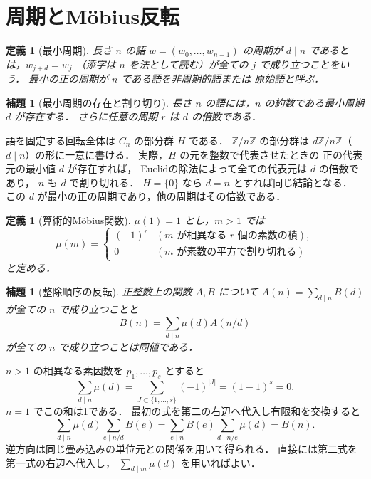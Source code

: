 \documentclass[a5paper,10pt,onecolumn]{jsarticle}
\makeatletter
\theoremstyle{mathnotetheorem}
\newtheorem{definition}[theorem]{定義}
\newtheorem{lemma}[theorem]{補題}
\renewcommand{\proofname}{証明}
\renewenvironment{proof}[1][\proofname]{%
  \par\pushQED{\qed}\normalfont\topsep4\p@\@plus2\p@\relax
  \trivlist\item[\hskip\labelsep\bfseries #1]\ignorespaces
}{\popQED\endtrivlist\@endpefalse}
\makeatother
\begin{document}
\section{周期とM\"obius反転}
\begin{definition}[最小周期]
長さ $n$ の語 $w=(w_0,\ldots,w_{n-1})$ の周期が
$d\mid n$ であるとは，$w_{j+d}=w_j$
（添字は $n$ を法として読む）が全ての $j$ で成り立つことをいう．
最小の正の周期が $n$ である語を\emph{非周期的語}または
\emph{原始語}と呼ぶ．
\end{definition}

\begin{lemma}[最小周期の存在と割り切り]\label{lem:minperiod}
長さ $n$ の語には，$n$ の約数である最小周期 $d$ が存在する．
さらに任意の周期 $r$ は $d$ の倍数である．
\end{lemma}
\begin{proof}
語を固定する回転全体は $C_n$ の部分群 $H$ である．
$\mathbb Z/n\mathbb Z$ の部分群は
$d\mathbb Z/n\mathbb Z$（$d\mid n$）の形に一意に書ける．
実際，$H$ の元を整数で代表させたときの
正の代表元の最小値 $d$ が存在すれば，
Euclidの除法によって全ての代表元は $d$ の倍数であり，
$n$ も $d$ で割り切れる．
$H=\{0\}$ なら $d=n$ とすれば同じ結論となる．
この $d$ が最小の正の周期であり，他の周期はその倍数である．
\end{proof}

\begin{definition}[算術的M\"obius関数]
$\mu(1)=1$ とし，$m>1$ では
\[
 \mu(m)=\begin{cases}
 (-1)^r & (m\text{ が相異なる }r\text{ 個の素数の積}),\\
 0 & (m\text{ が素数の平方で割り切れる})
 \end{cases}
\]
と定める．
\end{definition}

\begin{lemma}[整除順序の反転]\label{lem:arithinvert}
正整数上の関数 $A,B$ について
$A(n)=\sum_{d\mid n}B(d)$ が全ての $n$ で成り立つことと
\[
 B(n)=\sum_{d\mid n}\mu(d)A(n/d)
\]
が全ての $n$ で成り立つことは同値である．
\end{lemma}
\begin{proof}
$n>1$ の相異なる素因数を $p_1,\dots,p_s$ とすると
\[
 \sum_{d\mid n}\mu(d)
 =\sum_{J\subset\{1,\dots,s\}}(-1)^{|J|}
 =(1-1)^s=0.
\]
$n=1$ でこの和は1である．
最初の式を第二の右辺へ代入し有限和を交換すると
\[
 \sum_{d\mid n}\mu(d)\sum_{e\mid n/d}B(e)
 =\sum_{e\mid n}B(e)\sum_{d\mid n/e}\mu(d)=B(n).
\]
逆方向は同じ畳み込みの単位元との関係を用いて得られる．
直接には第二式を第一式の右辺へ代入し，
$\sum_{d\mid m}\mu(d)$ を用いればよい．
\end{proof}
\end{document}
